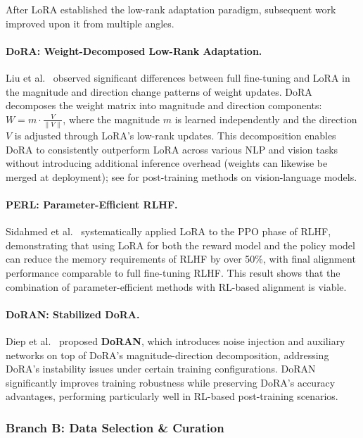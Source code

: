 After LoRA established the low-rank adaptation paradigm, subsequent work improved upon it from multiple angles.

\paragraph{DoRA: Weight-Decomposed Low-Rank Adaptation.}
Liu et al.\ \cite{liu2024dora} observed significant differences between full fine-tuning and LoRA in the magnitude and direction change patterns of weight updates.
DoRA decomposes the weight matrix into magnitude and direction components: $W = m \cdot \frac{V}{\|V\|}$,
where the magnitude $m$ is learned independently and the direction $V$ is adjusted through LoRA's low-rank updates.
This decomposition enables DoRA to consistently outperform LoRA across various NLP and vision tasks without introducing additional inference overhead (weights can likewise be merged at deployment);
see  for post-training methods on vision-language models.

\paragraph{PERL: Parameter-Efficient RLHF.}
Sidahmed et al.\ \cite{sidahmed2024perl} systematically applied LoRA to the PPO phase of RLHF,
demonstrating that using LoRA for both the reward model and the policy model can reduce the memory requirements of RLHF by over 50\%, with final alignment performance comparable to full fine-tuning RLHF.
This result shows that the combination of parameter-efficient methods with RL-based alignment is viable.

\paragraph{DoRAN: Stabilized DoRA.}
Diep et al.\ \cite{diep2025doran} proposed \textbf{DoRAN},
which introduces noise injection and auxiliary networks on top of DoRA's magnitude-direction decomposition,
addressing DoRA's instability issues under certain training configurations.
DoRAN significantly improves training robustness while preserving DoRA's accuracy advantages, performing particularly well in RL-based post-training scenarios.

\subsubsection{Branch B: Data Selection \& Curation}
\label{sec:t7-data-selection}

